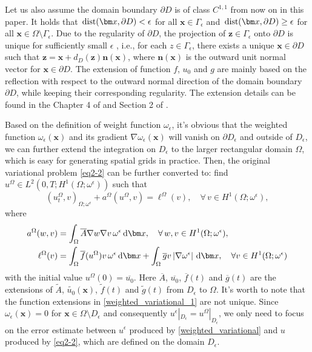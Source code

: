 \documentclass[3p,times]{elsarticle}
\numberwithin{equation}{section}
\newcommand{\dd}{\,{\rm d}}
\newcommand{\dist}{\,{\rm dist}}
\begin{document}
Let us also assume the domain boundary $\partial D$ is of class $C^{1,1}$ from now on in this paper. It holds that $\dist(\bm x,\partial D)< \epsilon$ for all $\bm x \in \Gamma_{\epsilon}$ and $\dist(\bm x,\partial D)\geq \epsilon$ for all $\bm x \in \Omega\setminus \Gamma_{\epsilon}$.  Due to the regularity of $\partial D$, the projection of $\bm z \in \Gamma_{\epsilon}$ onto $\partial D$ is unique for  sufficiently small $\epsilon$ \cite{Adams1975}, i.e., for each $z \in \Gamma_{\epsilon}$, there exists a unique $\bm x \in \partial D$ such that $\bm z = \bm x+d_{D}(\bm z)\bm n(\bm x)$, where $\bm n(\bm x)$ is the outward unit normal vector for $\bm x\in \partial D$. The extension of function $f$, $u_0$ and $g$ are mainly based on the reflection with respect to the outward normal direction of the domain boundary $\partial D$, while keeping their corresponding regularity. The extension details can be found in the Chapter 4 of \cite{Adams1975} and Section 2 of \cite{HaoJu2025}.

Based on the definition of weight function $\omega_{\epsilon}$, it's obvious that the weighted function  $\omega_{\epsilon}(\bm x)$ and its gradient $\nabla \omega_{\epsilon}(\bm x)$ will vanish on $\partial D_{\epsilon}$ and outside of $D_{\epsilon}$,  we can further extend the integration on $D_{\epsilon}$ to the larger rectangular domain $\Omega$, which is easy for generating spatial grids in practice. Then, the original variational problem \eqref{eq2-2} can be further converted to: find  $u^{\Omega} \in L^2(0,T;H^1(\Omega;\omega^{\epsilon}))$ such that
\begin{equation}
	\label{weighted_variational_1}
	\left(u_t^{\Omega},v\right)_{\Omega;\omega^{\epsilon}}+a^{\Omega}(u^{\Omega},v)= \ell^{\Omega}(v), \quad \forall\, v \in H^1(\Omega;\omega^{\epsilon}), 
\end{equation}
where
\begin{equation*}
	\begin{split}
		a^{\Omega}(w,v) &= \int_{\Omega} \overline{A}\nabla w\nabla v \,\omega^{\epsilon}\dd \bm x,\quad \forall\,w, v\in H^1(\Omega;\omega^{\epsilon}),\\
		\ell^{\Omega}(v) &= \int_{\Omega} \overline{f}(u^{\Omega})v\,\omega^{\epsilon}\dd \bm x + \int_{\Omega} \overline gv\left|\nabla \omega^{\epsilon} \right|\dd \bm x,\quad \forall v\in H^1(\Omega;\omega^{\epsilon})
	\end{split}
\end{equation*}
with the initial value $u^{\Omega}(0)=\overline{u_0}$. Here $\overline{A}$, $\overline{u_0}$, $\overline f(t)$ and $\overline g(t)$ are  the extensions of $\widetilde{A}$, $\widetilde{u_0}(\bm x)$, $\widetilde f(t)$ and $\widetilde g(t)$ from $D_{\epsilon}$ to $\Omega$. It's worth to note that the function extensions in \eqref{weighted_variational_1} are not unique. Since $\omega_{\epsilon}(\bm x)=0$ for $\bm x \in \Omega\setminus D_{\epsilon}$ and consequently $u^{\epsilon}|_{D_{\epsilon}}=u^{\Omega}|_{D_{\epsilon}}$, we only need to focus on the error estimate between $u^\epsilon$ produced by \eqref{weighted_variational} and $u$ produced by \eqref{eq2-2}, which are defined on the domain $D_{\epsilon}$.
\end{document}

